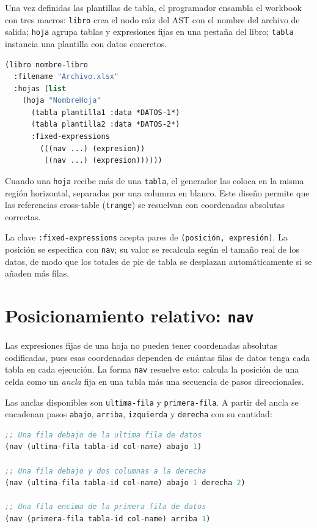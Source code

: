 Una vez definidas las plantillas de tabla, el programador ensambla el
workbook con tres macros: \texttt{libro} crea el nodo ra\'{\i}z del AST
con el nombre del archivo de salida; \texttt{hoja} agrupa tablas y
expresiones fijas en una pesta\~na del libro; \texttt{tabla} instancia
una plantilla con datos concretos.

\begin{lstlisting}[language=CommonLisp,
  caption={Ensamblaje del workbook con libro, hoja y tabla.}]
(libro nombre-libro
  :filename "Archivo.xlsx"
  :hojas (list
    (hoja "NombreHoja"
      (tabla plantilla1 :data *DATOS-1*)
      (tabla plantilla2 :data *DATOS-2*)
      :fixed-expressions
        (((nav ...) (expresion))
         ((nav ...) (expresion))))))
\end{lstlisting}

Cuando una \texttt{hoja} recibe m\'as de una \texttt{tabla}, el generador
las coloca en la misma regi\'on horizontal, separadas por una columna en
blanco.  Este dise\~no permite que las referencias cross-table
(\texttt{trange}) se resuelvan con coordenadas absolutas correctas.

La clave \texttt{:fixed-expressions} acepta pares de
\texttt{(posici\'on, expresi\'on)}.  La posici\'on se especifica con
\texttt{nav}; su valor se recalcula seg\'un el tama\~no real de los datos,
de modo que los totales de pie de tabla se desplazan autom\'aticamente si se
a\~naden m\'as filas.

\section{Posicionamiento relativo: \texttt{nav}}
\label{sec:nav-dsl}

Las expresiones fijas de una hoja no pueden tener coordenadas absolutas
codificadas, pues esas coordenadas dependen de cu\'antas filas de datos
tenga cada tabla en cada ejecuci\'on.  La forma \texttt{nav} resuelve esto:
calcula la posici\'on de una celda como un \emph{ancla} fija en una tabla
m\'as una secuencia de pasos direccionales.

Las anclas disponibles son \texttt{ultima-fila} y \texttt{primera-fila}.
A partir del ancla se encadenan pasos \texttt{abajo}, \texttt{arriba},
\texttt{izquierda} y \texttt{derecha} con su cantidad:

\begin{lstlisting}[language=CommonLisp,
  caption={Sintaxis de nav y anclas de tabla.}]
;; Una fila debajo de la ultima fila de datos
(nav (ultima-fila tabla-id col-name) abajo 1)

;; Una fila debajo y dos columnas a la derecha
(nav (ultima-fila tabla-id col-name) abajo 1 derecha 2)

;; Una fila encima de la primera fila de datos
(nav (primera-fila tabla-id col-name) arriba 1)
\end{lstlisting}

